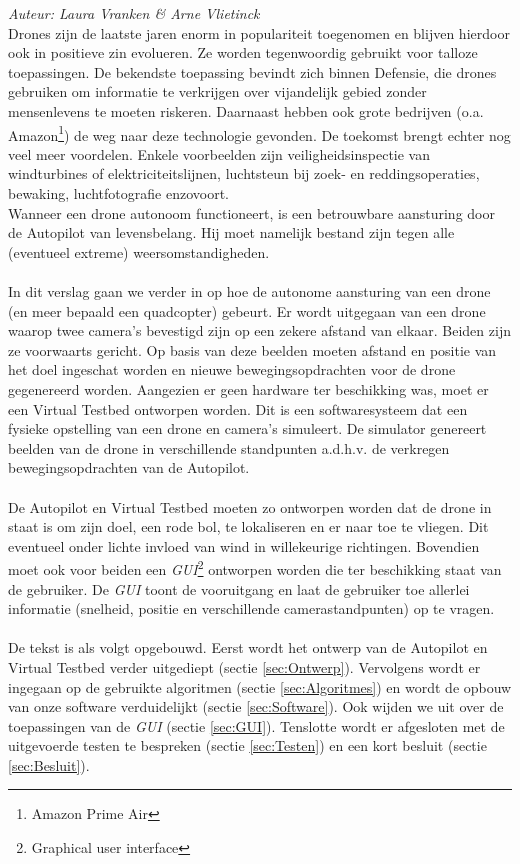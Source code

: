 {\em Auteur: Laura Vranken \& Arne Vlietinck}\\

\noindent
Drones zijn de laatste jaren enorm in populariteit toegenomen en blijven hierdoor ook in positieve zin evolueren. Ze worden tegenwoordig gebruikt voor talloze toepassingen. De bekendste toepassing bevindt zich binnen Defensie, die drones gebruiken om informatie te verkrijgen over vijandelijk gebied zonder mensenlevens te moeten riskeren. Daarnaast hebben ook grote bedrijven (o.a. Amazon\footnote{Amazon Prime Air}) de weg naar deze technologie gevonden. De toekomst brengt echter nog veel meer voordelen. Enkele voorbeelden zijn veiligheidsinspectie van windturbines of elektriciteitslijnen, luchtsteun bij zoek- en reddingsoperaties, bewaking, luchtfotografie enzovoort. \cite{website:microdrones}
\\
Wanneer een drone autonoom functioneert, is een betrouwbare aansturing door de Autopilot van levensbelang. Hij moet namelijk bestand zijn tegen alle (eventueel extreme) weersomstandigheden.
\\
\\
In dit verslag gaan we verder in op hoe de autonome aansturing van een drone (en meer bepaald een quadcopter) gebeurt. Er wordt uitgegaan van een drone waarop twee camera's bevestigd zijn op een zekere afstand van elkaar. Beiden zijn ze voorwaarts gericht. Op basis van deze beelden moeten afstand en positie van het doel ingeschat worden en nieuwe bewegingsopdrachten voor de drone gegenereerd worden. Aangezien er geen hardware ter beschikking was, moet er een Virtual Testbed ontworpen worden. Dit is een softwaresysteem dat een fysieke opstelling van een drone en camera's simuleert. \cite{arcticle:opgavePeno} De simulator genereert beelden van de drone in verschillende standpunten a.d.h.v. de verkregen bewegingsopdrachten van de Autopilot. 
\\
\\
De Autopilot en Virtual Testbed moeten zo ontworpen worden dat de drone in staat is om zijn doel, een rode bol, te lokaliseren en er naar toe te vliegen. Dit eventueel onder lichte invloed van wind in willekeurige richtingen. Bovendien moet ook voor beiden een \textit{GUI}\footnote{Graphical user interface} ontworpen worden die ter beschikking staat van de gebruiker. De \textit{GUI} toont de vooruitgang en laat de gebruiker toe allerlei informatie (snelheid, positie en verschillende camerastandpunten) op te vragen.
\\
\\
De tekst is als volgt opgebouwd. Eerst wordt het ontwerp van de Autopilot en Virtual Testbed verder uitgediept (sectie \ref{sec:Ontwerp}). Vervolgens wordt er ingegaan op de gebruikte algoritmen (sectie \ref{sec:Algoritmes}) en wordt de opbouw van onze software verduidelijkt (sectie \ref{sec:Software}). Ook wijden we uit over de toepassingen van de \textit{GUI} (sectie \ref{sec:GUI}). Tenslotte wordt er afgesloten met de uitgevoerde testen te bespreken (sectie \ref{sec:Testen}) en een kort besluit (sectie \ref{sec:Besluit}). \\